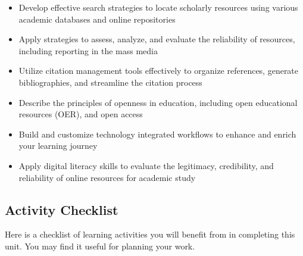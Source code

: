 \documentclass[
  letterpaper,
  DIV=11,
  numbers=noendperiod]{scrreprt}
\providecommand{\tightlist}{%
  \setlength{\itemsep}{0pt}\setlength{\parskip}{0pt}}\usepackage{longtable,booktabs,array}
\begin{document}
\begin{itemize}
\tightlist
\item
  Develop effective search strategies to locate scholarly resources
  using various academic databases and online repositories
\item
  Apply strategies to assess, analyze, and evaluate the reliability of
  resources, including reporting in the mass media
\item
  Utilize citation management tools effectively to organize references,
  generate bibliographies, and streamline the citation process
\item
  Describe the principles of openness in education, including open
  educational resources (OER), and open access
\item
  Build and customize technology integrated workflows to enhance and
  enrich your learning journey
\item
  Apply digital literacy skills to evaluate the legitimacy, credibility,
  and reliability of online resources for academic study
\end{itemize}

\subsection*{Activity Checklist}\label{activity-checklist-1}

Here is a checklist of learning activities you will benefit from in
completing this unit. You may find it useful for planning your work.
\end{document}
